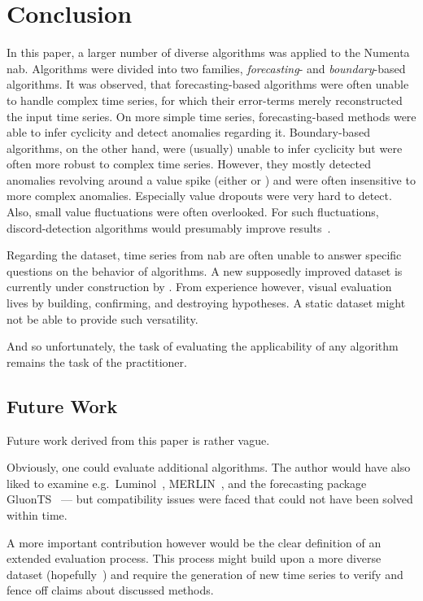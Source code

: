 \section{Conclusion}\label{sect:conclusion}
In this paper, a larger number of diverse algorithms was applied to the
Numenta \acrfull{nab}. Algorithms were divided into two families, \textit{forecasting}-
and \textit{boundary}-based algorithms. It was observed, that forecasting-based
algorithms were often unable to handle complex time series, for which their error-terms
merely reconstructed the input time series. On more simple time series,
forecasting-based methods were able to infer cyclicity and detect anomalies regarding
it. Boundary-based algorithms, on the other hand, were (usually) unable to infer cyclicity
but were often more robust to complex time series. However, they mostly detected
anomalies revolving around a value spike (either 
or ) and were often insensitive to more complex
anomalies. Especially value dropouts were very hard to detect. Also, small value
fluctuations were often overlooked. For such fluctuations, discord-detection
algorithms would presumably improve results~\cite[cf.][]{Nakamura.2020}.

Regarding the dataset, time series from \gls{nab} are often unable to answer
specific questions on the behavior of algorithms. A new supposedly improved
dataset is currently under construction by \textcite{Renjie.2020}. From experience
however, visual evaluation lives by building, confirming, and destroying
hypotheses. A static dataset might not be able to provide such versatility.

And so unfortunately, the task of evaluating the applicability of any algorithm
remains the task of the practitioner.

\subsection{Future Work}
Future work derived from this paper is rather vague.

Obviously, one could evaluate additional algorithms. The author would have also
liked to examine e.g.\ Luminol~\cite{LinkedIn.2015}, MERLIN~\cite{Renjie.2020},
and the forecasting package GluonTS~\cite{Alexandrov.2020} --- but compatibility
issues were faced that could not have been solved within time.

A more important contribution however would be the clear definition of an extended
evaluation process. This process might build upon a more diverse dataset
(hopefully~\cite{Renjie.2020}) and require the generation of new time series to
verify and fence off claims about discussed methods.